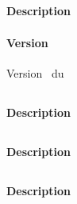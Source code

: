\subsection{\formationB}
\paragraph{Description} \descriptifFB
\paragraph{Version} Version \versionFB~du \dateversionFB


\subsection{\formationC}
\paragraph{Description} \descriptifFC


\subsection{\formationD}
\paragraph{Description} \descriptifFD

\subsection{\formationE}
\paragraph{Description} \descriptifFE

\subsection{\formationFa}
